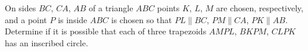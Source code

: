On sides $BC$, $CA$, $AB$ of a triangle $ABC$ points $K$, $L$, $M$ are chosen, respectively, and a point $P$ is inside $ABC$ is chosen so that  $PL\parallel BC$, $PM\parallel CA$, $PK\parallel AB$. Determine if it is possible that each of  three trapezoids $AMPL$, $BKPM$, $CLPK$ has an inscribed circle.